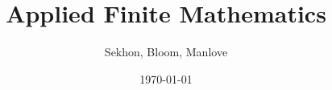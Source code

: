 \documentclass[12pt]{book}
\begin{document}
\frontmatter
\title{Applied Finite Mathematics}
\author{Sekhon, Bloom, Manlove}
\date{\today}
\maketitle
\tableofcontents

\mainmatter

% 

\backmatter
\end{document}
